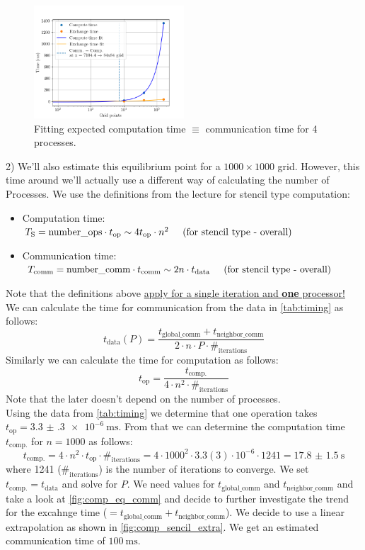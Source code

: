 \begin{figure}[H]
    \centering
    \includegraphics[width=0.5\textwidth]{../fig/lab2/estimate25.png}
    \caption{Fitting expected computation time $\equiv$ communication time for 4 processes.}
    \label{fig:comp_eq_comm}
\end{figure}

2) We'll also estimate this equilibrium point for a $1000\times1000$ grid. However, this time around we'll actually use a different way of calculating the number of Processes. We use the definitions from the lecture for stencil type computation: 
\begin{itemize}
    \item Computation time: $T_{\text{S}} = \text{number\_ops} \cdot t_\text{op} \sim  4 t_\text{op} \cdot n^2 \hspace{5mm} \text{(for stencil type - overall)}$
    \item Communication time: $T_{\text{comm}} = \text{number\_comm} \cdot t_\text{comm} \sim 2 n \cdot t_\text{data}\hspace{5mm} \text{(for stencil type - overall)}$
\end{itemize}
Note that the definitions above \underline{apply for a single iteration and \textbf{one} processor!}\\
We can calculate the time for communication from the data in \autoref{tab:timing} as follows: 
\[t_\text{data}(P) = \frac{t_\text{global\_comm}+t_\text{neighbor\_comm}}{2\cdot n \cdot P \cdot \#_\text{{iterations}}}\]
Similarly we can calculate the time for computation as follows:
\[t_\text{op} = \frac{t_\text{comp.}}{4 \cdot n^2 \cdot \#_\text{{iterations}}}\]
Note that the later doesn't depend on the number of processes.\\
Using the data from \autoref{tab:timing} we determine that one operation takes $t_\text{op} = \SI{3.3(3)e-6}{\milli\second}$. From that we can determine the computation time $t_{\text{comp.}}$ for $n=1000$ as follows:
\[t_{\text{comp.}} = 4 \cdot n^2 \cdot t_\text{op} \cdot \#_\text{{iterations}} = 4 \cdot 1000^2 \cdot 3.3(3) \cdot 10^{-6} \cdot 1241 = \SI{17.8(15)}{\second}\]
where 1241 ($\#_\text{{iterations}}$) is the number of iterations to converge. We set $t_{\text{comp.}} = t_{\text{data}}$ and solve for $P$. We need values for $t_\text{global\_comm}$ and $t_\text{neighbor\_comm}$ and take a look at \autoref{fig:comp_eq_comm} and decide to further investigate the trend for the excahnge time ($= t_\text{global\_comm} + t_\text{neighbor\_comm}$). We decide to use a linear extrapolation as shown in \autoref{fig:comp_sencil_extra}. We get an estimated communication time of $\SI{100}{\milli\second}$. \\

